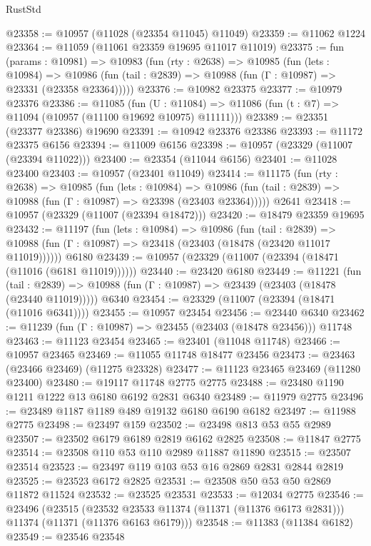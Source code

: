 \begin{lexlean}{RustStd}
\begin{coremodule}
@23358 := @10957 (@11028 (@23354 @11045) @11049)
@23359 := @11062 @1224
@23364 := @11059 (@11061 @23359 @19695 @11017 @11019)
@23375 := fun (params : @10981) =>
  @10983
    (fun (rty : @2638) =>
    @10985
      (fun (lets : @10984) =>
      @10986 (fun (tail : @2839) => @10988 (fun (Γ : @10987) => @23331 (@23358 @23364)))))
@23376 := @10982 @23375
@23377 := @10979 @23376
@23386 := @11085
    (fun (U : @11084) => @11086 (fun (t : @7) => @11094 (@10957 (@11100 @19692 @10975) @11111)))
@23389 := @23351 (@23377 @23386) @19690
@23391 := @10942 @23376 @23386
@23393 := @11172 @23375 @6156
@23394 := @11009 @6156
@23398 := @10957 (@23329 (@11007 (@23394 @11022)))
@23400 := @23354 (@11044 @6156)
@23401 := @11028 @23400
@23403 := @10957 (@23401 @11049)
@23414 := @11175
    (fun (rty : @2638) =>
    @10985
      (fun (lets : @10984) =>
      @10986 (fun (tail : @2839) => @10988 (fun (Γ : @10987) => @23398 (@23403 @23364)))))
    @2641
@23418 := @10957 (@23329 (@11007 (@23394 @18472)))
@23420 := @18479 @23359 @19695
@23432 := @11197
    (fun (lets : @10984) =>
    @10986
      (fun (tail : @2839) =>
      @10988 (fun (Γ : @10987) => @23418 (@23403 (@18478 (@23420 @11017 @11019))))))
    @6180
@23439 := @10957 (@23329 (@11007 (@23394 (@18471 (@11016 (@6181 @11019))))))
@23440 := @23420 @6180
@23449 := @11221
    (fun (tail : @2839) => @10988 (fun (Γ : @10987) => @23439 (@23403 (@18478 (@23440 @11019)))))
    @6340
@23454 := @23329 (@11007 (@23394 (@18471 (@11016 @6341))))
@23455 := @10957 @23454
@23456 := @23440 @6340
@23462 := @11239 (fun (Γ : @10987) => @23455 (@23403 (@18478 @23456))) @11748
@23463 := @11123 @23454
@23465 := @23401 (@11048 @11748)
@23466 := @10957 @23465
@23469 := @11055 @11748 @18477 @23456
@23473 := @23463 (@23466 @23469) (@11275 @23328)
@23477 := @11123 @23465 @23469 (@11280 @23400)
@23480 := @19117 @11748 @2775 @2775
@23488 := @23480 @1190 @1211 @1222 @13 @6180 @6192 @2831 @6340
@23489 := @11979 @2775
@23496 := @23489 @1187 @1189 @489 @19132 @6180 @6190 @6182
@23497 := @11988 @2775
@23498 := @23497 @159
@23502 := @23498 @813 @53 @55 @2989
@23507 := @23502 @6179 @6189 @2819 @6162 @2825
@23508 := @11847 @2775
@23514 := @23508 @110 @53 @110 @2989 @11887 @11890
@23515 := @23507 @23514
@23523 := @23497 @119 @103 @53 @16 @2869 @2831 @2844 @2819
@23525 := @23523 @6172 @2825
@23531 := @23508 @50 @53 @50 @2869 @11872 @11524
@23532 := @23525 @23531
@23533 := @12034 @2775
@23546 := @23496
    (@23515
      (@23532 @23533 @11374 (@11371 (@11376 @6173 @2831)))
      @11374
      (@11371 (@11376 @6163 @6179)))
@23548 := @11383 (@11384 @6182)
@23549 := @23546 @23548

\end{coremodule}
\end{lexlean}
